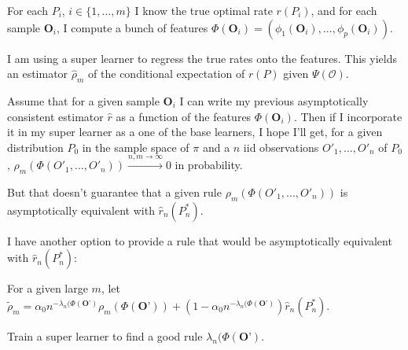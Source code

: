 \documentclass[a4paper]{article}
\begin{document}
For each $P_i$, $i \in \{1,...,m\}$ I know the true optimal rate $r(P_i)$, and for each sample $\textbf{O}_i$, I compute a bunch of features $\Phi(\textbf{O}_i) = (\phi_1(\textbf{O}_i),...,\phi_p(\textbf{O}_i))$.

I am using a super learner to regress the true rates onto the features. This yields an estimator $\hat{\rho}_m$ of the conditional expectation of $r(P)$ given $\Psi(\mathcal{O})$.

\medskip

Assume that for a given sample $\textbf{O}_i$ I can write my previous asymptotically consistent estimator $\hat{r}$ as a function of the features $\Phi(\textbf{O}_i)$. Then if I incorporate it in my super learner as a one of the base learners, I hope I'll get, for a given distribution $P_0$ in the sample space of $\pi$ and a $n$ iid observations $O'_1,...,O'_n$ of $P_0$, 
$\rho_m(\Phi(O'_1,...,O'_n)) \xrightarrow{n,m \rightarrow \infty} 0$ in probability.

\medskip

But that doesn't guarantee that a given rule $\rho_m(\Phi(O'_1,...,O'_n))$ is asymptotically equivalent with $\hat{r}_n(P_n^*)$.

\medskip

I have another option to provide a rule that would be asymptotically equivalent with $\hat{r}_n(P_n^*)$:

For a given large $m$, let $\tilde{\rho}_m = \alpha_0 n^{-\lambda_n(\Phi(\textbf{O'})}  \rho_m(\Phi(\textbf{O'})) + (1 - \alpha_0 n^{-\lambda_n(\Phi(\textbf{O'})}) \hat{r}_n(P_n^*) $.

Train a super learner to find a good rule $\lambda_n(\Phi(\textbf{O'})$.
\end{document}
